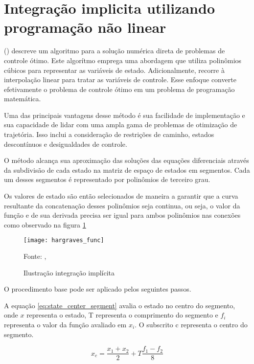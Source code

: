 \section{Integração implicita utilizando programação não linear}

\citeauthor{hargraves87} (\citeyear{hargraves87}) descreve um algoritmo para a solução numérica direta de problemas de controle ótimo. 
Este algorítmo emprega uma abordagem que utiliza polinômios cúbicos para representar as variáveis de estado. Adicionalmente, recorre à interpolação linear para tratar as variáveis de controle. 
Esse enfoque converte efetivamente o problema de controle ótimo em um problema de programação matemática.

Uma das principais vantagens desse método é sua facilidade de implementação e sua capacidade de lidar com uma ampla gama de problemas de otimização de trajetória. Isso inclui a consideração de restrições de caminho, estados descontínuos e desigualdades de controle.

O método alcança sua aproximação das soluções das equações diferenciais através da subdivisão de cada estado na matriz de espaço de estados em segmentos. Cada um desses segmentos é representado por polinômios de terceiro grau.

Os valores de estado são então selecionados de maneira a garantir que a curva resultante da concatenação desses polinômios seja continua, ou seja,
o valor da função e de sua derivada precisa ser igual para ambos polinômios nas conexões como observado na figura \ref{fig:hargraves_fun}

\begin{figure}[!htb]
    \centering
    \caption{Ilustração integração implícita}
    \texttt{[image: hargraves\_func]}

    {\footnotesize Fonte: \citeauthor{hargraves87}, \citeyear{hargraves87}}
    \label{fig:hargraves_fun}
\end{figure}

O procedimento base pode ser aplicado pelos seguintes passos.

A equação \ref{eq:state_center_segment} avalia o estado no centro do segmento, onde $x$ representa o estado, 
T representa o comprimento do segmento e $f_i$ representa o valor da função avaliado em $x_i$.
O subscrito c representa o centro do segmento.

\begin{equation}
    \label{eq:state_center_segment}
    x_c = \frac{x_{1} + x_{2}}{2} + T\frac{f_{1} - f_{2}}{8}
\end{equation}

